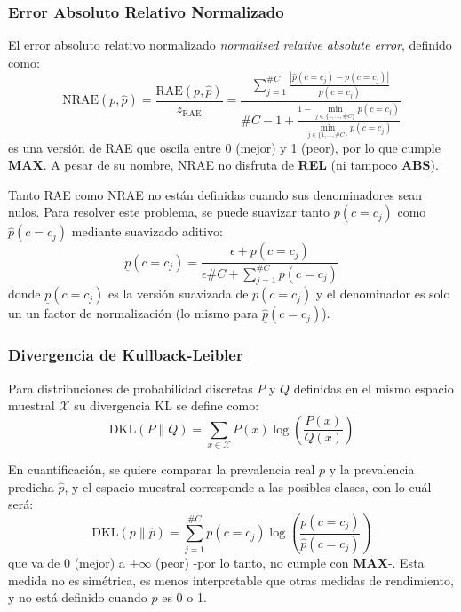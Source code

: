 \subsubsection{Error Absoluto Relativo Normalizado}\label{evaluacion:nrae}

El error absoluto relativo normalizado {\it normalised relative absolute error},
definido como:
\begin{equation}
    {\text{NRAE}(p, \hat p)} = \frac{\text{RAE}(p, \hat p)}{z_{\text{RAE}}} = \frac{\sum \limits_{j=1}^{\#C}{\frac{|\hat p(c=c_j) - p(c=c_j)|}{p(c=c_j)}}}{\#C - 1 + \frac {1 - \displaystyle \min_{j\in\{1,\dots,\#C\}}p(c=c_j)}{\displaystyle \min_{j\in\{1,\dots,\#C\}}p(c=c_j)}}\label{evaluacion:eq_nrae}
\end{equation}
es una versión de RAE que oscila entre 0 (mejor) y 1 (peor), por lo que cumple
{\bf MAX}. A pesar de su nombre, NRAE no disfruta de {\bf REL} (ni tampoco {\bf
ABS}).

Tanto RAE como NRAE no están definidas cuando sus denominadores sean nulos. Para
resolver este problema, se puede suavizar tanto $p(c=c_j)$ como $\hat p(c=c_j)$
mediante suavizado aditivo:
\begin{equation}
    \underline p(c=c_j) = \frac{\epsilon + p(c=c_j)}{\epsilon  \#C + \sum \limits_{j=1}^{\#C}{p(c=c_j)}}\label{evaluacion:eq_suav_rae_nrae}
\end{equation}
donde $\underline p(c=c_j)$ es la versión suavizada de $p(c=c_j)$ y el
denominador es solo un un factor de normalización (lo mismo para $\underline
{\hat p}(c=c_j)$).

\subsubsection{Divergencia de Kullback-Leibler}\label{evaluacion:dkl}

Para distribuciones de probabilidad discretas $P$ y $Q$ definidas en el mismo
espacio muestral ${\mathcal {X}}$ su divergencia KL se define como:
\begin{equation}
    {\text{DKL}}(P\parallel Q)=\sum \limits_{x\in {\mathcal {X}}}P(x)\log \left({\frac {P(x)}{Q(x)}}\right)\label{evaluacion:eq_dkl}
\end{equation}

En cuantificación, se quiere comparar la prevalencia real $p$ y la prevalencia
predicha $\hat{p}$, y el espacio muestral corresponde a las posibles clases, con
lo cuál será:
\begin{equation}
    {\text{DKL}}(p\parallel \hat{p}) = \sum \limits_{j=1}^{\#C}p(c=c_j)\log \left({\frac {p(c=c_j)}{\hat p(c=c_j)}}\right)\label{evaluacion:eq_dkl2}
\end{equation}
que va de {0} (mejor) a {+$\infty$} (peor) -por lo tanto, no cumple con {\bf
MAX}-. Esta medida no es simétrica, es menos interpretable que otras medidas de
rendimiento, y no está definido cuando $\hat{p}$ es 0 o 1.

